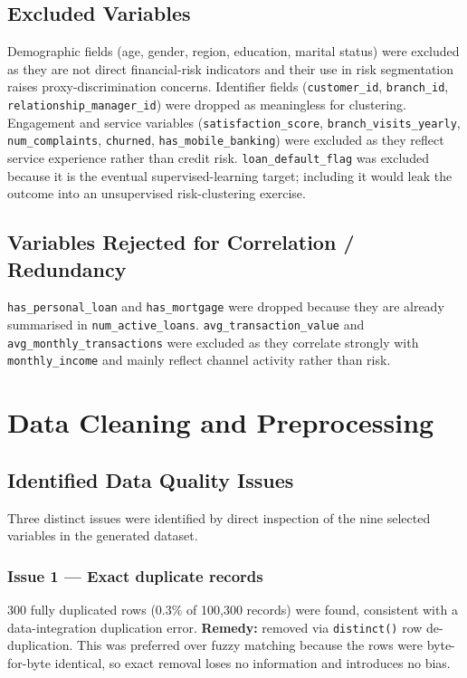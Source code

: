 \documentclass[11pt]{article}
\begin{document}
\subsection{Excluded Variables}

Demographic fields (age, gender, region, education, marital status) were excluded as they are not direct financial-risk indicators and their use in risk segmentation raises proxy-discrimination concerns. Identifier fields (\texttt{customer\_id}, \texttt{branch\_id}, \texttt{relationship\_manager\_id}) were dropped as meaningless for clustering. Engagement and service variables (\texttt{satisfaction\_score}, \texttt{branch\_visits\_yearly}, \texttt{num\_complaints}, \texttt{churned}, \texttt{has\_mobile\_banking}) were excluded as they reflect service experience rather than credit risk. \texttt{loan\_default\_flag} was excluded because it is the eventual supervised-learning target; including it would leak the outcome into an unsupervised risk-clustering exercise.

\subsection{Variables Rejected for Correlation / Redundancy}

\texttt{has\_personal\_loan} and \texttt{has\_mortgage} were dropped because they are already summarised in \texttt{num\_active\_loans}. \texttt{avg\_transaction\_value} and \texttt{avg\_monthly\_transactions} were excluded as they correlate strongly with \texttt{monthly\_income} and mainly reflect channel activity rather than risk.

\section{Data Cleaning and Preprocessing}
\label{sec:cleaning}

\subsection{Identified Data Quality Issues}

Three distinct issues were identified by direct inspection of the nine selected variables in the generated dataset.

\subsubsection*{Issue 1 --- Exact duplicate records}
300 fully duplicated rows (0.3\% of 100{,}300 records) were found, consistent with a data-integration duplication error. \textbf{Remedy:} removed via \texttt{distinct()} row de-duplication. This was preferred over fuzzy matching because the rows were byte-for-byte identical, so exact removal loses no information and introduces no bias.
\end{document}
